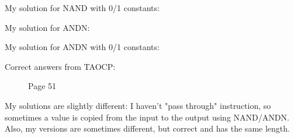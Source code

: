 

My solution for NAND with 0/1 constants:



My solution for ANDN:



My solution for ANDN with 0/1 constants:



Correct answers from TAOCP:

\begin{figure}[H]
\centering
{}
\caption{Page 51}
\end{figure}

My solutions are slightly different: I haven't "pass through" instruction, so sometimes a value is copied from the input to the output using NAND/ANDN.
Also, my versions are sometimes different, but correct and has the same length.

